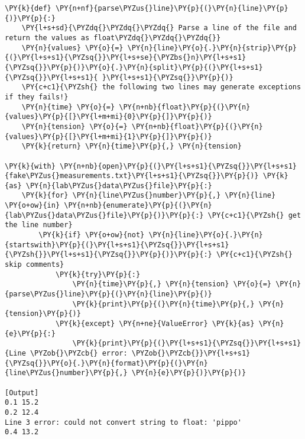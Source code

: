 \begin{Verbatim}[label=\makebox{\url{https://github.com/lucabaldini/cmepda/tree/master/slides/latex/snippets/when\_to\_catch\_2.py}},commandchars=\\\{\}]
\PY{k}{def} \PY{n+nf}{parse\PYZus{}line}\PY{p}{(}\PY{n}{line}\PY{p}{)}\PY{p}{:}
    \PY{l+s+sd}{\PYZdq{}\PYZdq{}\PYZdq{} Parse a line of the file and return the values as float\PYZdq{}\PYZdq{}\PYZdq{}}
    \PY{n}{values} \PY{o}{=} \PY{n}{line}\PY{o}{.}\PY{n}{strip}\PY{p}{(}\PY{l+s+s1}{\PYZsq{}}\PY{l+s+se}{\PYZbs{}n}\PY{l+s+s1}{\PYZsq{}}\PY{p}{)}\PY{o}{.}\PY{n}{split}\PY{p}{(}\PY{l+s+s1}{\PYZsq{}}\PY{l+s+s1}{ }\PY{l+s+s1}{\PYZsq{}}\PY{p}{)}
    \PY{c+c1}{\PYZsh{} the following two lines may generate exceptions if they fails!}
    \PY{n}{time} \PY{o}{=} \PY{n+nb}{float}\PY{p}{(}\PY{n}{values}\PY{p}{[}\PY{l+m+mi}{0}\PY{p}{]}\PY{p}{)}
    \PY{n}{tension} \PY{o}{=} \PY{n+nb}{float}\PY{p}{(}\PY{n}{values}\PY{p}{[}\PY{l+m+mi}{1}\PY{p}{]}\PY{p}{)}
    \PY{k}{return} \PY{n}{time}\PY{p}{,} \PY{n}{tension}

\PY{k}{with} \PY{n+nb}{open}\PY{p}{(}\PY{l+s+s1}{\PYZsq{}}\PY{l+s+s1}{fake\PYZus{}measurements.txt}\PY{l+s+s1}{\PYZsq{}}\PY{p}{)} \PY{k}{as} \PY{n}{lab\PYZus{}data\PYZus{}file}\PY{p}{:}
    \PY{k}{for} \PY{n}{line\PYZus{}number}\PY{p}{,} \PY{n}{line} \PY{o+ow}{in} \PY{n+nb}{enumerate}\PY{p}{(}\PY{n}{lab\PYZus{}data\PYZus{}file}\PY{p}{)}\PY{p}{:} \PY{c+c1}{\PYZsh{} get the line number}
        \PY{k}{if} \PY{o+ow}{not} \PY{n}{line}\PY{o}{.}\PY{n}{startswith}\PY{p}{(}\PY{l+s+s1}{\PYZsq{}}\PY{l+s+s1}{\PYZsh{}}\PY{l+s+s1}{\PYZsq{}}\PY{p}{)}\PY{p}{:} \PY{c+c1}{\PYZsh{} skip comments}
            \PY{k}{try}\PY{p}{:}
                \PY{n}{time}\PY{p}{,} \PY{n}{tension} \PY{o}{=} \PY{n}{parse\PYZus{}line}\PY{p}{(}\PY{n}{line}\PY{p}{)}
                \PY{k}{print}\PY{p}{(}\PY{n}{time}\PY{p}{,} \PY{n}{tension}\PY{p}{)}
            \PY{k}{except} \PY{n+ne}{ValueError} \PY{k}{as} \PY{n}{e}\PY{p}{:}
                \PY{k}{print}\PY{p}{(}\PY{l+s+s1}{\PYZsq{}}\PY{l+s+s1}{Line \PYZob{}\PYZcb{} error: \PYZob{}\PYZcb{}}\PY{l+s+s1}{\PYZsq{}}\PY{o}{.}\PY{n}{format}\PY{p}{(}\PY{n}{line\PYZus{}number}\PY{p}{,} \PY{n}{e}\PY{p}{)}\PY{p}{)}

[Output]
0.1 15.2
0.2 12.4
Line 3 error: could not convert string to float: 'pippo'
0.4 13.2
\end{Verbatim}